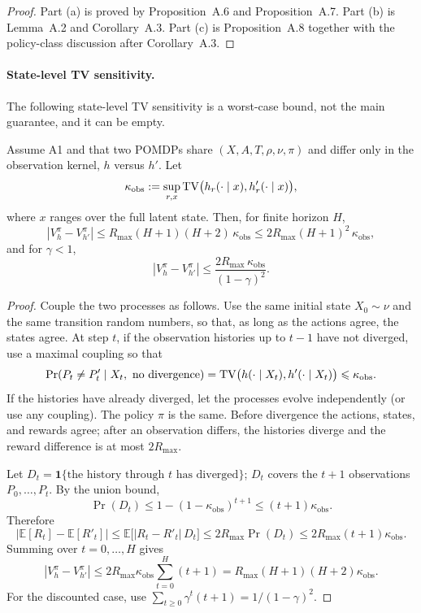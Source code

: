 \begin{proof}
Part (a) is proved by Proposition~A.6 and Proposition~A.7.  Part (b) is
Lemma~A.2 and Corollary~A.3.  Part (c) is Proposition~A.8 together with the
policy-class discussion after Corollary~A.3.
\end{proof}

\paragraph{State-level TV sensitivity.}
The following state-level TV sensitivity is a worst-case bound, not the main
guarantee, and it can be empty.

\begin{aIIPropTV}
Assume A1 and that two POMDPs share $(X,A,T,\rho,\nu,\pi)$ and differ only in
the observation kernel, $h$ versus $h'$.  Let
\[
\kappa_{\mathrm{obs}}
:=\sup_{r,x}\mathrm{TV}\bigl(h_r(\cdot\mid x),h'_r(\cdot\mid x)\bigr),
\]
where $x$ ranges over the full latent state.  Then, for finite horizon $H$,
\[
|V_h^\pi-V_{h'}^\pi|
\le R_{\max}(H+1)(H+2)\,\kappa_{\mathrm{obs}}
\le 2R_{\max}(H+1)^2\,\kappa_{\mathrm{obs}},
\]
and for $\gamma<1$,
\[
|V_h^\pi-V_{h'}^\pi|
\le \frac{2R_{\max}\,\kappa_{\mathrm{obs}}}{(1-\gamma)^2}.
\]
\end{aIIPropTV}

\begin{proof}
Couple the two processes as follows.  Use the same initial state
$X_0\sim\nu$ and the same transition random numbers, so that, as long as the
actions agree, the states agree.  At step $t$, if the observation histories up
to $t-1$ have not diverged, use a maximal coupling so that
\[
\Pr(P_t\ne P'_t\mid X_t,\text{ no divergence})
=\mathrm{TV}\bigl(h(\cdot\mid X_t),h'(\cdot\mid X_t)\bigr)
\leqslant\kappa_{\mathrm{obs}}.
\]
If the histories have already diverged, let the processes evolve independently
(or use any coupling).  The policy $\pi$ is the same.  Before divergence the
actions, states, and rewards agree; after an observation differs, the histories
diverge and the reward difference is at most $2R_{\max}$.

Let $D_t=\mathbf{1}\{\text{the history through }t\text{ has diverged}\}$;
$D_t$ covers the $t+1$ observations $P_0,\dots,P_t$.  By the union bound,
\[
\Pr(D_t)\le 1-(1-\kappa_{\mathrm{obs}})^{t+1}
\le (t+1)\kappa_{\mathrm{obs}}.
\]
Therefore
\[
|\mathbb E[R_t]-\mathbb E[R'_t]|
\le \mathbb E\bigl[|R_t-R'_t|\,D_t\bigr]
\le 2R_{\max}\Pr(D_t)
\le 2R_{\max}(t+1)\kappa_{\mathrm{obs}}.
\]
Summing over $t=0,\dots,H$ gives
\[
|V_h^\pi-V_{h'}^\pi|
\le 2R_{\max}\kappa_{\mathrm{obs}}\sum_{t=0}^{H}(t+1)
=R_{\max}(H+1)(H+2)\kappa_{\mathrm{obs}}.
\]
For the discounted case, use
$\sum_{t\ge0}\gamma^t(t+1)=1/(1-\gamma)^2$.
\end{proof}

